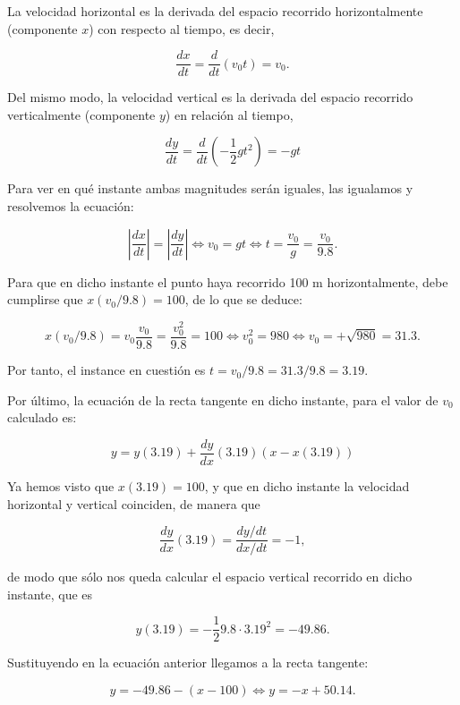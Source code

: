 \documentclass[
  spanish,
  a4paper,
]{scrreport}
\theoremstyle{definition}
\theoremstyle{remark}
\begin{document}
\begin{tcolorbox}[enhanced jigsaw, arc=.35mm, bottomrule=.15mm, bottomtitle=1mm, breakable, colback=white, colbacktitle=quarto-callout-tip-color!10!white, colframe=quarto-callout-tip-color-frame, coltitle=black, left=2mm, leftrule=.75mm, opacityback=0, opacitybacktitle=0.6, rightrule=.15mm, title=\textcolor{quarto-callout-tip-color}{\faLightbulb}\hspace{0.5em}{Solución}, titlerule=0mm, toprule=.15mm, toptitle=1mm]

La velocidad horizontal es la derivada del espacio recorrido
horizontalmente (componente \(x\)) con respecto al tiempo, es decir,

\[
\frac{dx}{dt} = \frac{d}{dt}(v_0t)=v_0.
\]

Del mismo modo, la velocidad vertical es la derivada del espacio
recorrido verticalmente (componente \(y\)) en relación al tiempo,

\[
\frac{dy}{dt} = \frac{d}{dt}(-\frac{1}{2}gt^2)=-gt
\]

Para ver en qué instante ambas magnitudes serán iguales, las igualamos y
resolvemos la ecuación:

\[
\left|\frac{dx}{dt}\right|=\left|\frac{dy}{dt}\right| \Leftrightarrow v_0 = gt \Leftrightarrow t=\frac{v_0}{g}=\frac{v_0}{9.8}.
\]

Para que en dicho instante el punto haya recorrido 100 m
horizontalmente, debe cumplirse que \(x(v_0/9.8)=100\), de lo que se
deduce:

\[
x(v_0/9.8)=v_0\frac{v_0}{9.8} = \frac{v_0^2}{9.8}=100 \Leftrightarrow v_0^2 = 980 \Leftrightarrow v_0 = +\sqrt{980}= 31.3.
\]

Por tanto, el instance en cuestión es \(t=v_0/9.8= 31.3/9.8 = 3.19\).

Por último, la ecuación de la recta tangente en dicho instante, para el
valor de \(v_0\) calculado es:

\[
y = y(3.19) + \frac{dy}{dx}(3.19) (x-x(3.19))
\]

Ya hemos visto que \(x(3.19)=100\), y que en dicho instante la velocidad
horizontal y vertical coinciden, de manera que

\[
\frac{dy}{dx}(3.19)=\frac{dy/dt}{dx/dt}=-1,
\]

de modo que sólo nos queda calcular el espacio vertical recorrido en
dicho instante, que es

\[
y(3.19)=-\frac{1}{2}9.8\cdot 3.19^2= -49.86.
\]

Sustituyendo en la ecuación anterior llegamos a la recta tangente:

\[
y = -49.86-(x-100) \Leftrightarrow y=-x+50.14.
\]

\end{tcolorbox}
\end{document}
